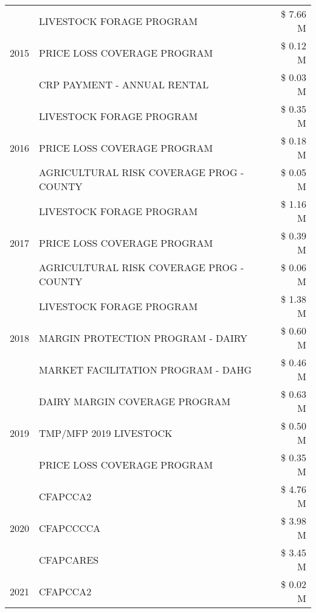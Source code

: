 \begin{tabular}{llr}
\cline{1-3}
\multirow[t]{3}{*}{2015} & LIVESTOCK FORAGE PROGRAM & \$ 7.66 M \\
 & PRICE LOSS COVERAGE PROGRAM & \$ 0.12 M \\
 & CRP PAYMENT - ANNUAL RENTAL & \$ 0.03 M \\
\cline{1-3}
\multirow[t]{3}{*}{2016} & LIVESTOCK FORAGE PROGRAM & \$ 0.35 M \\
 & PRICE LOSS COVERAGE PROGRAM & \$ 0.18 M \\
 & AGRICULTURAL RISK COVERAGE PROG - COUNTY & \$ 0.05 M \\
\cline{1-3}
\multirow[t]{3}{*}{2017} & LIVESTOCK FORAGE PROGRAM & \$ 1.16 M \\
 & PRICE LOSS COVERAGE PROGRAM & \$ 0.39 M \\
 & AGRICULTURAL RISK COVERAGE PROG - COUNTY & \$ 0.06 M \\
\cline{1-3}
\multirow[t]{3}{*}{2018} & LIVESTOCK FORAGE PROGRAM & \$ 1.38 M \\
 & MARGIN PROTECTION PROGRAM - DAIRY & \$ 0.60 M \\
 & MARKET FACILITATION PROGRAM - DAHG & \$ 0.46 M \\
\cline{1-3}
\multirow[t]{3}{*}{2019} & DAIRY MARGIN COVERAGE PROGRAM & \$ 0.63 M \\
 & TMP/MFP 2019 LIVESTOCK & \$ 0.50 M \\
 & PRICE LOSS COVERAGE PROGRAM & \$ 0.35 M \\
\cline{1-3}
\multirow[t]{3}{*}{2020} & CFAPCCA2 & \$ 4.76 M \\
 & CFAPCCCCA & \$ 3.98 M \\
 & CFAPCARES & \$ 3.45 M \\
\cline{1-3}
2021 & CFAPCCA2 & \$ 0.02 M \\
\cline{1-3}
\bottomrule
\end{tabular}
